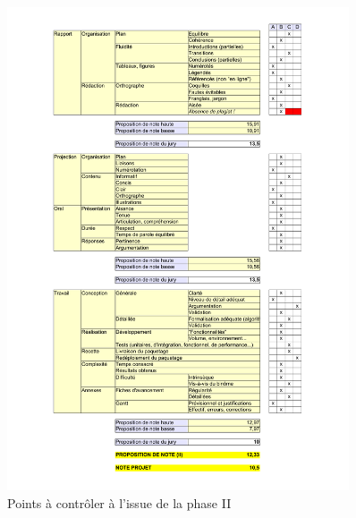 \documentclass[11pt, french]{report-rd-info}
\begin{document}
\begin{figure}
         \includegraphics[width=0.9\textwidth]{Images/Grille-Evaluation-PRD2}
      \fi
	\caption{Points à contrôler à l'issue de la phase II}
	\label{fig:AutoEvaluationTravailFinal}
\end{figure}
\end{document}
